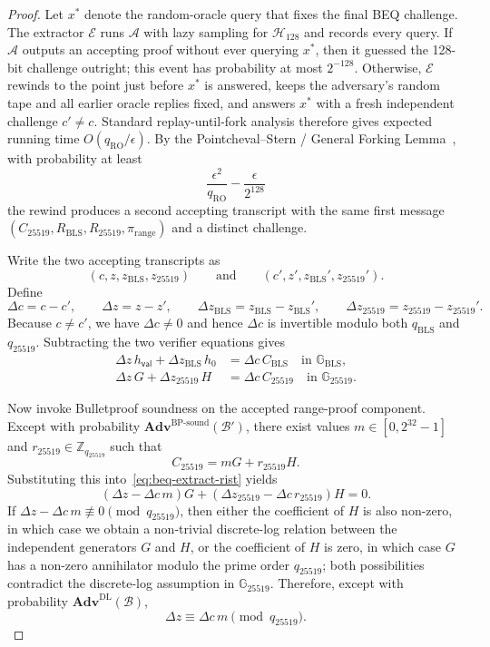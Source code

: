 \documentclass[11pt]{article}
\theoremstyle{definitionstyle}
\theoremstyle{plain}
\newcommand{\advantage}[1]{\mathbf{Adv}^{\mathrm{#1}}}
\begin{document}
\begin{proof}
Let $x^*$ denote the random-oracle query that fixes the final BEQ challenge. The extractor $\mathcal{E}$ runs $\mathcal{A}$ with lazy sampling for $\mathcal{H}_{128}$ and records every query. If $\mathcal{A}$ outputs an accepting proof without ever querying $x^*$, then it guessed the 128-bit challenge outright; this event has probability at most $2^{-128}$. Otherwise, $\mathcal{E}$ rewinds to the point just before $x^*$ is answered, keeps the adversary's random tape and all earlier oracle replies fixed, and answers $x^*$ with a fresh independent challenge $c' \neq c$. Standard replay-until-fork analysis therefore gives expected running time $O(q_{\text{RO}}/\epsilon)$. By the Pointcheval--Stern / General Forking Lemma~\cite{PointchevalStern00,BellareNeven06}, with probability at least
\[
\frac{\epsilon^2}{q_{\text{RO}}} - \frac{\epsilon}{2^{128}}
\]
the rewind produces a second accepting transcript with the same first message
$(C_{25519},R_{\text{BLS}},R_{25519},\pi_{\text{range}})$ and a distinct challenge.

Write the two accepting transcripts as
\[
(c,z,z_{\text{BLS}},z_{25519}) \qquad \text{and} \qquad (c',z',z_{\text{BLS}}',z_{25519}').
\]
Define
\[
\Delta c = c-c',\qquad \Delta z = z-z',\qquad \Delta z_{\text{BLS}} = z_{\text{BLS}}-z_{\text{BLS}}',\qquad \Delta z_{25519}=z_{25519}-z_{25519}'.
\]
Because $c \neq c'$, we have $\Delta c \neq 0$ and hence $\Delta c$ is invertible modulo both $q_{\text{BLS}}$ and $q_{25519}$. Subtracting the two verifier equations gives
\begin{align}
\Delta z\, h_{\mathsf{val}} + \Delta z_{\text{BLS}}\, h_0 &= \Delta c\, C_{\text{BLS}} \quad \text{in } \mathbb{G}_{\text{BLS}}, \label{eq:beq-extract-bls}\\
\Delta z\, G + \Delta z_{25519}\, H &= \Delta c\, C_{25519} \quad \text{in } \mathbb{G}_{25519}. \label{eq:beq-extract-rist}
\end{align}

Now invoke Bulletproof soundness on the accepted range-proof component. Except with probability $\advantage{BP\text{-}sound}(\mathcal{B}')$, there exist values $m \in [0,2^{32}-1]$ and $r_{25519} \in \mathbb{Z}_{q_{25519}}$ such that
\[
C_{25519} = mG + r_{25519}H.
\]
Substituting this into~\eqref{eq:beq-extract-rist} yields
\[
(\Delta z - \Delta c\, m)G + (\Delta z_{25519} - \Delta c\, r_{25519})H = 0.
\]
If $\Delta z - \Delta c\, m \not\equiv 0 \pmod{q_{25519}}$, then either the coefficient of $H$ is also non-zero, in which case we obtain a non-trivial discrete-log relation between the independent generators $G$ and $H$, or the coefficient of $H$ is zero, in which case $G$ has a non-zero annihilator modulo the prime order $q_{25519}$; both possibilities contradict the discrete-log assumption in $\mathbb{G}_{25519}$. Therefore, except with probability $\advantage{DL}(\mathcal{B})$,
\[
\Delta z \equiv \Delta c\, m \pmod{q_{25519}}.
\]


\end{proof}
\end{document}
